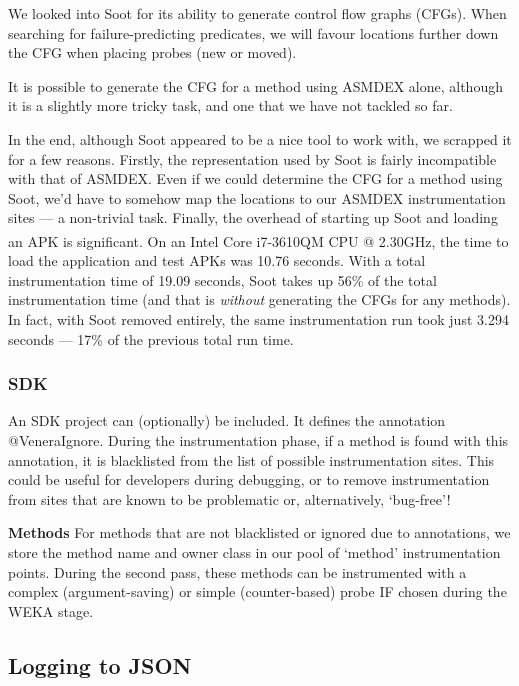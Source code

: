 We looked into Soot for its ability to generate control flow graphs (CFGs). When
searching for failure-predicting predicates, we will favour locations further
down the CFG when placing probes (new or moved).

It is possible to generate the CFG for a method using ASMDEX alone, although it
is a slightly more tricky task, and one that we have not tackled so far.

In the end, although Soot appeared to be a nice tool to work with, we scrapped
it for a few reasons. Firstly, the representation used by Soot is fairly
incompatible with that of ASMDEX. Even if we could determine the CFG for a
method using Soot, we'd have to somehow map the locations to our ASMDEX
instrumentation sites --- a non-trivial task. Finally, the overhead of starting
up Soot and loading an APK is significant. On an
Intel\textsuperscript{\textregistered} Core\textsuperscript{\texttrademark}
i7-3610QM CPU @ 2.30GHz, the time to load the application and test APKs was
10.76 seconds. With a total instrumentation time of 19.09 seconds, Soot takes up
56\% of the total instrumentation time (and that is \textit{without} generating
the CFGs for any methods). In fact, with Soot removed entirely, the same
instrumentation run took just 3.294 seconds --- 17\% of the previous total run
time.

\subsubsection{SDK}
\label{sec:sec:venera_sdk}

An SDK project can (optionally) be included. It defines the annotation
@VeneraIgnore. During the instrumentation phase, if a method is found with
this annotation, it is blacklisted from the list of possible instrumentation
sites. This could be useful for developers during debugging, or to remove
instrumentation from sites that are known to be problematic or, alternatively,
{\lq}bug-free{\rq}!

\textbf{Methods} For methods that are not blacklisted or ignored due to
annotations, we store the method name and owner class in our pool of
{\lq}method{\rq} instrumentation points. During the second pass, these methods
can be instrumented with a complex (argument-saving) or simple (counter-based)
probe IF chosen during the WEKA stage.

\subsection{Logging to JSON}

